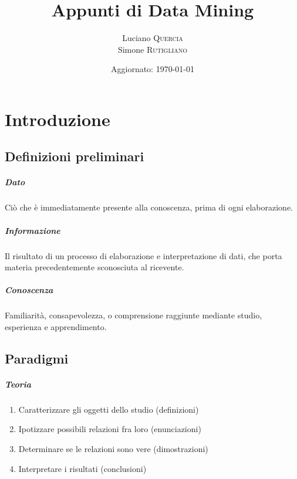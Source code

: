 \documentclass[11pt,onecolumn,a4paper,oneside]{book}
\author{Luciano \textsc{Quercia}\\Simone \textsc{Rutigliano}}
\date{Aggiornato: \today}
\title{Appunti di Data Mining}
\begin{document}
\maketitle


\tableofcontents

\chapter{Introduzione}

	\section{Definizioni preliminari}
		\paragraph{Dato}
Ciò che è immediatamente presente alla conoscenza, prima di ogni elaborazione.

		\paragraph{Informazione}
		Il risultato di un processo di elaborazione e interpretazione di dati, che porta materia precedentemente sconosciuta al ricevente.

		\paragraph{Conoscenza}
Familiarità, consapevolezza, o comprensione raggiunte mediante studio, esperienza e apprendimento.	
			
\section{Paradigmi}
	\paragraph{Teoria}
\begin{enumerate}
\item Caratterizzare gli oggetti dello studio (definizioni)
\item Ipotizzare possibili relazioni fra loro (enunciazioni)
\item Determinare se le relazioni sono vere (dimostrazioni)
\item Interpretare i risultati (conclusioni)
\end{enumerate}
		
\end{document}
